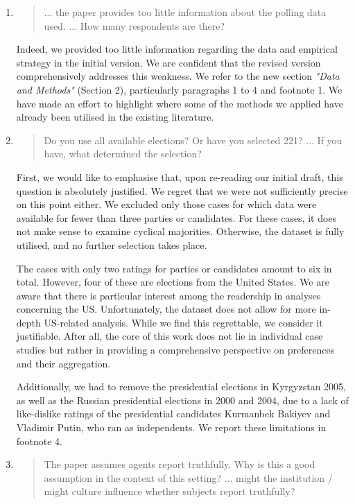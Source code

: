 \documentclass[a4paper, 12pt]{scrartcl}
\begin{document}
\begin{enumerate}[label=(\alph*)] 
	\item
\begin{quote}
$\ldots$ the paper provides too little information about the polling data used. $\ldots$ How many respondents are there?
\end{quote}	
Indeed, we provided too little information regarding the data and empirical strategy in the initial version. We are confident that the revised version comprehensively addresses this weakness. We refer to the new section \textit{"Data and Methods"} (Section 2), particularly paragraphs 1 to 4 and footnote 1. We have made an effort to highlight where some of the methods we applied have already been utilised in the existing literature.
\item 
\begin{quote}
	Do you use all available elections? Or have you selected 221? $\ldots$ If you have, what determined the selection?
\end{quote}
First, we would like to emphasise that, upon re-reading our initial draft, this question is absolutely justified. We regret that we were not sufficiently precise on this point either. We excluded only those cases for which data were available for fewer than three parties or candidates. For these cases, it does not make sense to examine cyclical majorities. Otherwise, the dataset is fully utilised, and no further selection takes place. 

The cases with only two ratings for parties or candidates amount to six in total. However, four of these are elections from the United States. We are aware that there is particular interest among the readership in analyses concerning the US. Unfortunately, the dataset does not allow for more in-depth US-related analysis. While we find this regrettable, we consider it justifiable. After all, the core of this work does not lie in individual case studies but rather in providing a comprehensive perspective on preferences and their aggregation.

Additionally, we had to remove the presidential elections in Kyrgyzstan 2005, as well as the Russian presidential elections in 2000 and 2004, due to a lack of like-dislike ratings of the presidential candidates Kurmanbek Bakiyev and Vladimir Putin, who ran as independents. We report these limitations in footnote 4.
\item \begin{quote}
	The paper assumes agents report truthfully. Why is this a good assumption in the context of this setting? $\ldots$ might the institution / might culture influence whether subjects report truthfully?
\end{quote}


\end{enumerate}
\end{document}
